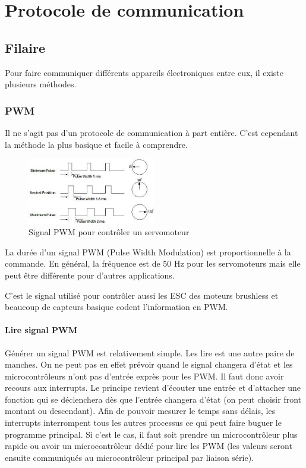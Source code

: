 \documentclass[a4paper, 11pt]{report}
\begin{document}
\chapter{Protocole de communication}

\section{Filaire}

Pour faire communiquer différents appareils électroniques entre eux, il existe plusieurs méthodes.

\subsection{PWM}
Il ne s'agit pas d'un protocole de communication à part entière. C'est cependant la méthode la plus basique et facile à comprendre.


\begin{figure}[h!]
\begin{centering}
\includegraphics[width=0.5\textwidth]{images/PWMservo.jpeg}
\caption{Signal PWM pour contrôler un servomoteur}
\par\end{centering}
\end{figure}

La durée d'un signal PWM (Pulse Width Modulation) est proportionnelle à la commande. En général, la fréquence est de 50 Hz pour les servomoteurs mais elle peut être différente pour d'autres applications.

C'est le signal utilisé pour contrôler aussi les ESC des moteurs brushless et beaucoup de capteurs basique codent l'information en PWM.

\subsubsection{Lire signal PWM}
Générer un signal PWM est relativement simple. Les lire est une autre paire de manches. On ne peut pas en effet prévoir quand le signal changera d'état et les microcontrôleurs n'ont pas d'entrée exprès pour les PWM. Il faut donc avoir recours aux interrupts. Le principe revient d'écouter une entrée et d'attacher une fonction qui se déclenchera dès que l'entrée changera d'état (on peut choisir front montant ou descendant). Afin de pouvoir mesurer le temps sans délais, les interrupts interrompent tous les autres processus ce qui peut faire buguer le programme principal. Si c'est le cas, il faut soit prendre un microcontrôleur plus rapide ou avoir un microcontrôleur dédié pour lire les PWM (les valeurs seront ensuite communiqués au microcontrôleur principal par liaison série).
\end{document}
